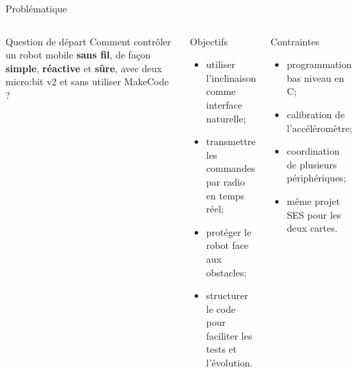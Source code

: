 \documentclass[aspectratio=169]{beamer}
\begin{document}
\begin{frame}{Probl\'ematique}
  \begin{columns}[T,onlytextwidth]
    \begin{block}{Question de d\'epart}
      Comment contr\^oler un robot mobile \textbf{sans fil}, de fa\c{c}on
      \textbf{simple}, \textbf{r\'eactive} et \textbf{s\^ure}, avec deux
      micro:bit v2 et sans utiliser MakeCode ?
    \end{block}

    \begin{block}{Objectifs}
      \begin{itemize}
        \item utiliser l'inclinaison comme interface naturelle;
        \item transmettre les commandes par radio en temps r\'eel;
        \item prot\'eger le robot face aux obstacles;
        \item structurer le code pour faciliter les tests et l'\'evolution.
      \end{itemize}
    \end{block}

    \begin{alertblock}{Contraintes}
      \begin{itemize}
        \item programmation bas niveau en C;
        \item calibration de l'acc\'el\'erom\`etre;
        \item coordination de plusieurs p\'eriph\'eriques;
        \item m\^eme projet SES pour les deux cartes.
      \end{itemize}
    \end{alertblock}
  \end{columns}
\end{frame}
\end{document}
